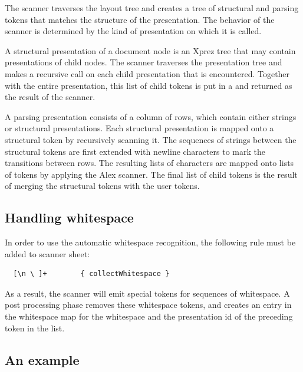 \documentclass[12pt]{article}
\begin{document}
The scanner traverses the layout tree and creates a tree of structural and parsing tokens that matches the structure of the presentation. The behavior of the scanner is determined by the kind of presentation on which it is called.



\noindent A structural presentation of a document node is an Xprez tree that may contain presentations of child nodes. The scanner traverses the presentation tree and makes a recursive call on each child presentation that is encountered. Together with the entire presentation, this list of child tokens is put in a  and returned as the result of the scanner.


\noindent A parsing presentation consists of a column of rows, which contain either strings or structural presentations. Each structural presentation is mapped onto a structural token by recursively scanning it. The sequences of strings between the structural tokens are first extended with newline characters to mark the transitions between rows. The resulting lists of characters are mapped onto lists of  tokens by applying the Alex scanner. The final list of child tokens is the result of merging the structural tokens with the user tokens.


\subsection{Handling whitespace}

In order to use the automatic whitespace recognition, the following rule must be added to scanner sheet:

\begin{footnotesize}
\begin{verbatim}
  [\n \ ]+        { collectWhitespace }
\end{verbatim} %
\end{footnotesize}

As a result, the scanner will emit special tokens for sequences of whitespace. A post processing phase removes these whitespace tokens, and creates an entry in the whitespace map for the whitespace and the presentation id of the preceding token in the list. 


\subsection{An example}
\end{document}
